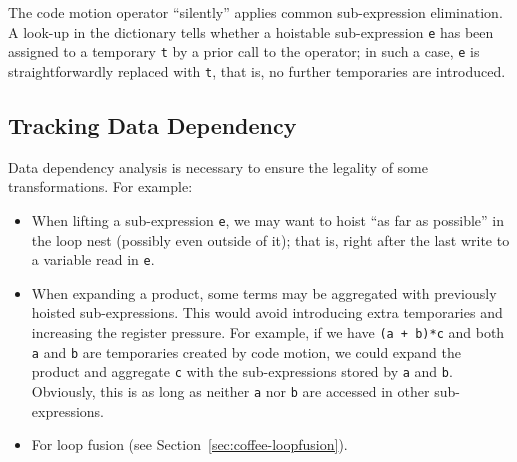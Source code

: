 The code motion operator ``silently'' applies common sub-expression elimination. A look-up in the dictionary tells whether a hoistable sub-expression \texttt{e} has been assigned to a temporary \texttt{t} by a prior call to the operator; in such a case, \texttt{e} is straightforwardly replaced with \texttt{t}, that is, no further temporaries are introduced. 

%


\subsection{Tracking Data Dependency}
Data dependency analysis is necessary to ensure the legality of some transformations. For example:
\begin{itemize}
\item When lifting a sub-expression \texttt{e}, we may want to hoist ``as far as possible'' in the loop nest (possibly even outside of it); that is, right after the last write to a variable read in \texttt{e}.
\item When expanding a product, some terms may be aggregated with previously hoisted sub-expressions. This would avoid introducing extra temporaries and increasing the register pressure. For example, if we have \texttt{(a + b)*c} and both \texttt{a} and \texttt{b} are temporaries created by code motion, we could expand the product and aggregate \texttt{c} with the sub-expressions stored by \texttt{a} and \texttt{b}. Obviously, this is as long as neither \texttt{a} nor \texttt{b} are accessed in other sub-expressions.
\item For loop fusion (see Section~\ref{sec:coffee-loopfusion}).
\end{itemize}

